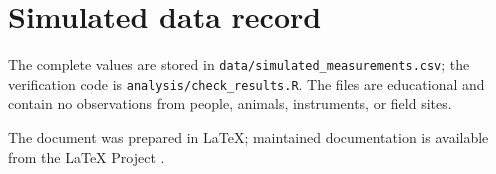 \section{Simulated data record}
\label{app:data}

The complete values are stored in
\texttt{data/simulated\_measurements.csv}; the verification code is
\texttt{analysis/check\_results.R}. The files are educational and contain no
observations from people, animals, instruments, or field sites.

The document was prepared in \LaTeX{}; maintained documentation is available from
the \LaTeX{} Project \parencite{latexprojectDocumentation}.
